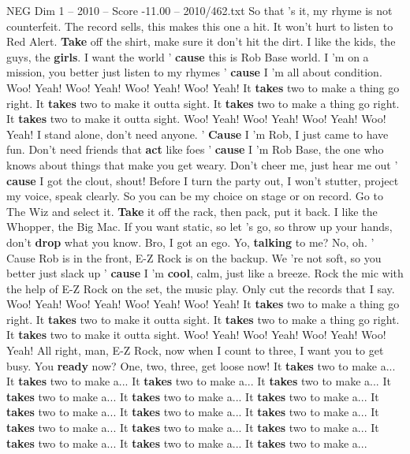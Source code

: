 \begin{textsample}{NEG Dim 1 – 2010 – Score -11.00 – 2010/462.txt}
So that 's it, my rhyme is not counterfeit.
The record sells, this makes this one a hit.
It won't hurt to listen to Red Alert. \textbf{Take} off the shirt, make sure it don't hit the dirt.
I like the kids, the guys, the \textbf{girls}.
I want the world ' \textbf{cause} this is Rob Base world.
I 'm on a mission, you better just listen to my rhymes ' \textbf{cause} I 'm all about condition.
Woo!
Yeah!
Woo!
Yeah!
Woo!
Yeah!
Woo!
Yeah!
It \textbf{takes} two to make a thing go right.
It \textbf{takes} two to make it outta sight.
It \textbf{takes} two to make a thing go right.
It \textbf{takes} two to make it outta sight.
Woo!
Yeah!
Woo!
Yeah!
Woo!
Yeah!
Woo!
Yeah!
I stand alone, don't need anyone. ' \textbf{Cause} I 'm Rob, I just came to have fun.
Don't need friends that \textbf{act} like foes ' \textbf{cause} I 'm Rob Base, the one who knows about things that make you get weary.
Don't cheer me, just hear me out ' \textbf{cause} I got the clout, shout!
Before I turn the party out, I won't stutter, project my voice, speak clearly.
So you can be my choice on stage or on record.
Go to The Wiz and select it. \textbf{Take} it off the rack, then pack, put it back.
I like the Whopper, the Big Mac.
If you want static, so let 's go, so throw up your hands, don't \textbf{drop} what you know.
Bro, I got an ego.
Yo, \textbf{talking} to me?
No, oh. ' Cause Rob is in the front, E-Z Rock is on the backup.
We 're not soft, so you better just slack up ' \textbf{cause} I 'm \textbf{cool}, calm, just like a breeze.
Rock the mic with the help of E-Z Rock on the set, the music play.
Only cut the records that I say.
Woo!
Yeah!
Woo!
Yeah!
Woo!
Yeah!
Woo!
Yeah!
It \textbf{takes} two to make a thing go right.
It \textbf{takes} two to make it outta sight.
It \textbf{takes} two to make a thing go right.
It \textbf{takes} two to make it outta sight.
Woo!
Yeah!
Woo!
Yeah!
Woo!
Yeah!
Woo!
Yeah!
All right, man, E-Z Rock, now when I count to three, I want you to get busy.
You \textbf{ready} now?
One, two, three, get loose now!
It \textbf{takes} two to make a...
It \textbf{takes} two to make a...
It \textbf{takes} two to make a...
It \textbf{takes} two to make a...
It \textbf{takes} two to make a...
It \textbf{takes} two to make a...
It \textbf{takes} two to make a...
It \textbf{takes} two to make a...
It \textbf{takes} two to make a...
It \textbf{takes} two to make a...
It \textbf{takes} two to make a...
It \textbf{takes} two to make a...
It \textbf{takes} two to make a...
It \textbf{takes} two to make a...
It \textbf{takes} two to make a...
It \textbf{takes} two to make a...

\end{textsample}

